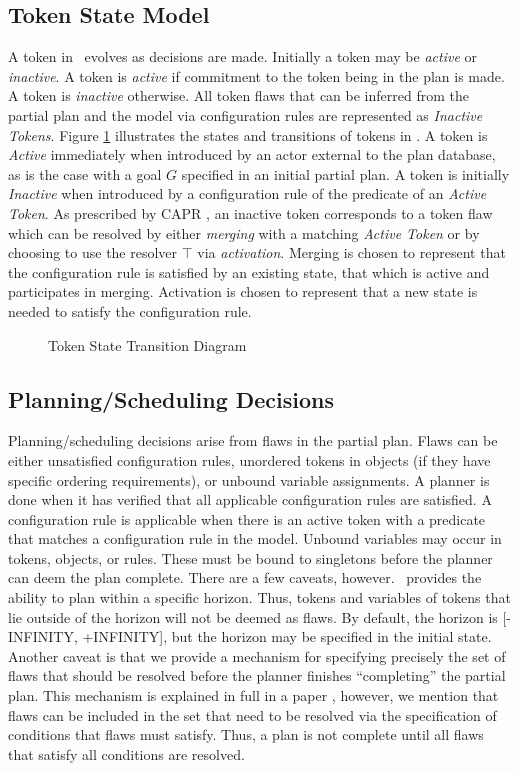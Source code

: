 \documentclass[10pt, letterpaper, twoside]{article}
\begin{document}
\subsection{Token State Model}
\label{token-state}
A token in \ET\, evolves as decisions are made.  Initially a token may be
{\em active} or {\em inactive}.  A token is {\em active} if commitment to
the token being in the plan is made.  A token is {\em inactive} otherwise. 
All token flaws that can be inferred from the partial plan and the model
via configuration rules are represented as {\em Inactive Tokens}. Figure
\ref{TokenStateTransition} illustrates the states and transitions of tokens
in \ET. A token is {\em Active} immediately when introduced by an actor
external to the plan database, as is the case with a goal $G$ specified in
an initial partial plan. A token is initially {\em Inactive} when
introduced by a configuration rule of the predicate of an {\em Active
Token}.  As prescribed by CAPR \cite{e2}, an inactive token corresponds to
a token flaw which can be resolved by either {\em merging} with a matching
{\em Active Token} or by choosing to use the resolver $\top$ via {\em
activation}. Merging is chosen to represent that the configuration rule is
satisfied by an existing state, that which is active and participates in
merging. Activation is chosen to represent that a new state is needed to
satisfy the configuration rule. 
\begin{figure}[t]
\centering{}
\caption{Token State Transition Diagram}
\label{TokenStateTransition}
\end{figure}

\subsection{Planning/Scheduling Decisions}
\label{decisions}
Planning/scheduling decisions arise from flaws in the partial plan.  Flaws
can be either unsatisfied configuration rules, unordered tokens in objects
(if they have specific ordering requirements), or unbound variable
assignments.  A planner is done when it has verified that all applicable
configuration rules are satisfied.  A configuration rule is applicable when
there is an active token with a predicate that matches a configuration rule
in the model.  Unbound variables may occur in tokens, objects, or rules.
These must be bound to singletons before the planner can deem the plan
complete.  There are a few caveats, however.  \ET\, provides the ability to
plan within a specific horizon.  Thus, tokens and variables of tokens that
lie outside of the horizon will not be deemed as flaws.  By default, the
horizon is [-INFINITY, +INFINITY], but the horizon may be specified in the
initial state. Another caveat is that we provide a mechanism for specifying
precisely the set of flaws that should be resolved before the planner
finishes ``completing'' the partial plan.  This mechanism is explained in
full in a paper \cite{planid}, however, we mention that flaws can be
included in the set that need to be resolved via the specification of
conditions that flaws must satisfy.  Thus, a plan is not complete until all
flaws that satisfy all conditions are resolved.
\end{document}
